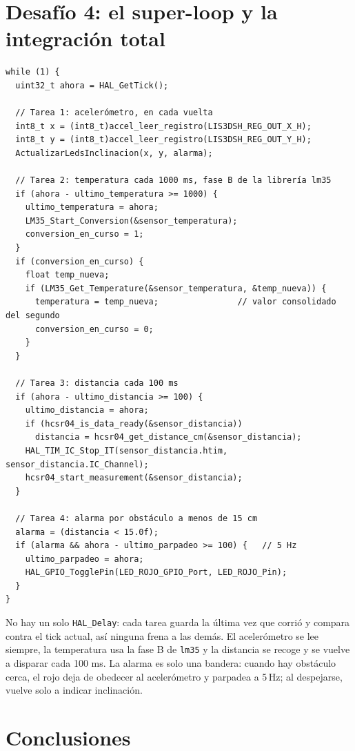 \documentclass[11pt,a4paper]{article}
\begin{document}
\section*{Desafío 4: el super-loop y la integración total}

\begin{lstlisting}
while (1) {
  uint32_t ahora = HAL_GetTick();

  // Tarea 1: acelerómetro, en cada vuelta
  int8_t x = (int8_t)accel_leer_registro(LIS3DSH_REG_OUT_X_H);
  int8_t y = (int8_t)accel_leer_registro(LIS3DSH_REG_OUT_Y_H);
  ActualizarLedsInclinacion(x, y, alarma);

  // Tarea 2: temperatura cada 1000 ms, fase B de la librería lm35
  if (ahora - ultimo_temperatura >= 1000) {
    ultimo_temperatura = ahora;
    LM35_Start_Conversion(&sensor_temperatura);
    conversion_en_curso = 1;
  }
  if (conversion_en_curso) {
    float temp_nueva;
    if (LM35_Get_Temperature(&sensor_temperatura, &temp_nueva)) {
      temperatura = temp_nueva;                // valor consolidado del segundo
      conversion_en_curso = 0;
    }
  }

  // Tarea 3: distancia cada 100 ms
  if (ahora - ultimo_distancia >= 100) {
    ultimo_distancia = ahora;
    if (hcsr04_is_data_ready(&sensor_distancia))
      distancia = hcsr04_get_distance_cm(&sensor_distancia);
    HAL_TIM_IC_Stop_IT(sensor_distancia.htim, sensor_distancia.IC_Channel);
    hcsr04_start_measurement(&sensor_distancia);
  }

  // Tarea 4: alarma por obstáculo a menos de 15 cm
  alarma = (distancia < 15.0f);
  if (alarma && ahora - ultimo_parpadeo >= 100) {   // 5 Hz
    ultimo_parpadeo = ahora;
    HAL_GPIO_TogglePin(LED_ROJO_GPIO_Port, LED_ROJO_Pin);
  }
}
\end{lstlisting}

No hay un solo \texttt{HAL\_Delay}: cada tarea guarda la última vez que corrió y compara contra
el tick actual, así ninguna frena a las demás. El acelerómetro se lee siempre, la temperatura usa
la fase B de \texttt{lm35} y la distancia se recoge y se vuelve a disparar cada 100 ms. La alarma
es solo una bandera: cuando hay obstáculo cerca, el rojo deja de obedecer al acelerómetro y
parpadea a 5\,Hz; al despejarse, vuelve solo a indicar inclinación.

\section*{Conclusiones}
\end{document}
